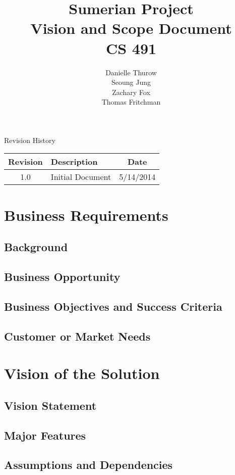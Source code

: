 \documentclass[11pt]{article}
\title{Sumerian Project\\
		Vision and Scope Document\\
		CS 491}
\author{Danielle Thurow \\
		  Seoung Jung\\
		  Zachary Fox\\
		  Thomas Fritchman}
\date{}
\begin{document}
\maketitle
\newpage

\tableofcontents
\newpage

\begin{center}
\Large Revision History\\
\begin{tabularx}{\textwidth}{|c|X|c|}
	\hline
	\textbf{Revision} & \textbf{Description} & \textbf{Date}\\ \hline
	1.0 & Initial Document & 5/14/2014\\ \hline
\end{tabularx}
\end{center}
\newpage

\section{Business Requirements}
\subsection{Background}
\subsection{Business Opportunity}
\subsection{Business Objectives and Success Criteria}
\subsection{Customer or Market Needs}

\section{Vision of the Solution}
\subsection{Vision Statement}
\subsection{Major Features}
\subsection{Assumptions and Dependencies}
\end{document}
